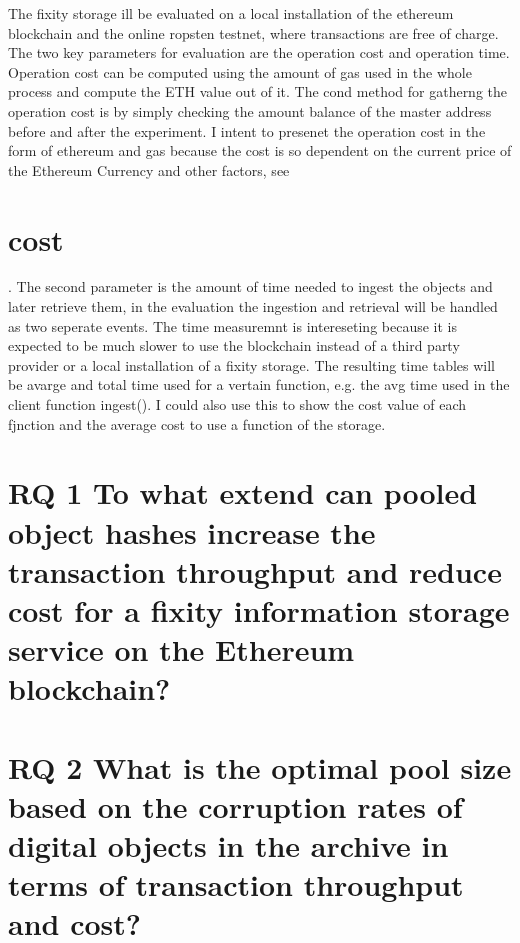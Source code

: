 The fixity storage ill be evaluated on a local installation of the ethereum blockchain and the online ropsten testnet, where transactions are free of charge.
The two key parameters for evaluation are the operation cost and operation time. Operation cost can be computed using the amount of gas used in the whole process and compute the ETH value out of it. The cond method for gatherng the operation cost is by simply checking the amount balance of the master address before and after the experiment. I intent to presenet the operation cost in the form of ethereum and gas because the cost is so dependent on the current price of the Ethereum Currency and other factors, see \section{cost}. The second parameter is the amount of time needed to ingest the objects and later retrieve them, in the evaluation the ingestion and retrieval will be handled as two seperate events. The time measuremnt is intereseting because it is expected to be much slower to use the blockchain instead of a third party provider or a local installation of a fixity storage. The resulting time tables will be avarge and total time used for a vertain function, e.g. the avg time used in the client function ingest(). I could also use this to show the cost value of each fjnction and the average cost to use a function of the storage.

\section{RQ 1 To what extend can pooled object hashes increase the transaction throughput and reduce cost for a fixity information storage service on the Ethereum blockchain?}

\section{RQ 2 What is the optimal pool size based on the corruption rates of digital objects in the archive in terms of transaction throughput and cost?}


